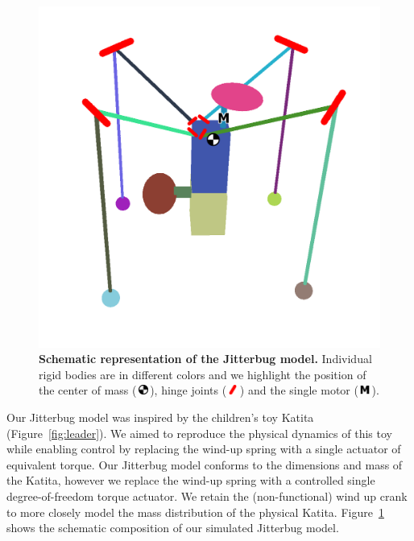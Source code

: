 \documentclass[letterpaper, 10 pt, conference]{ieeeconf}
\newcommand{\com}{\,\includegraphics[width=9pt]{ico-com}\,}
\newcommand{\hinge}{\,\includegraphics[width=9pt]{ico-hinge}\,}
\newcommand{\motor}{\,\includegraphics[width=9pt]{ico-motor}\,}
\begin{document}
\begin{figure}[t]
    \centering
    \includegraphics[width=\linewidth]{fig-jitterbug-parts}
    \caption[
        Schematic representation of the Jitterbug model.
        Individual rigid bodies are in different colors and we highlight the position of the center of mass, hinge joints and the single motor.
    ]{
        \textbf{Schematic representation of the Jitterbug model.}
        Individual rigid bodies are in different colors and we highlight the position of the center of mass (\protect\com), hinge joints  (\protect\hinge) and the single motor (\protect\motor).
    }
    \label{fig:parts}
\end{figure}

Our Jitterbug model was inspired by the children's toy Katita (Figure~\ref{fig:leader}).
We aimed to reproduce the physical dynamics of this toy while enabling control by replacing the wind-up spring with a single actuator of equivalent torque.
Our Jitterbug model conforms to the dimensions and mass of the Katita, however we replace the wind-up spring with a controlled single degree-of-freedom torque actuator.
We retain the (non-functional) wind up crank to more closely model the mass distribution of the physical Katita.
Figure~\ref{fig:parts} shows the schematic composition of our simulated Jitterbug model.
\end{document}
